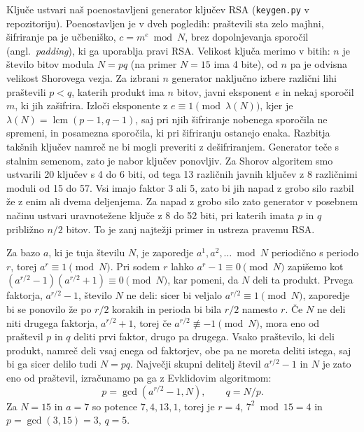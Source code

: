  Ključe ustvari naš poenostavljeni generator ključev RSA (\texttt{keygen.py} v repozitoriju). Poenostavljen je v dveh pogledih: praštevili sta zelo majhni, šifriranje pa je učbeniško, $c = m^e \bmod N$, brez dopolnjevanja sporočil (angl.\ \emph{padding}), ki ga uporablja pravi RSA. Velikost ključa merimo v bitih: $n$ je število bitov modula $N = pq$ (na primer $N = 15$ ima 4 bite), od $n$ pa je odvisna velikost Shorovega vezja. Za izbrani $n$ generator naključno izbere različni lihi praštevili $p < q$, katerih produkt ima $n$ bitov, javni eksponent $e$ in nekaj sporočil $m$, ki jih zašifrira. Izloči eksponente z $e \equiv 1 \pmod{\lambda(N)}$, kjer je $\lambda(N) = \operatorname{lcm}(p-1, q-1)$, saj pri njih šifriranje nobenega sporočila ne spremeni, in posamezna sporočila, ki pri šifriranju ostanejo enaka. Razbitja takšnih ključev namreč ne bi mogli preveriti z dešifriranjem. Generator teče s stalnim semenom, zato je nabor ključev ponovljiv. Za Shorov algoritem smo ustvarili 20 ključev s 4 do 6 biti, od tega 13 različnih javnih ključev z 8 različnimi moduli od 15 do 57. Vsi imajo faktor 3 ali 5, zato bi jih napad z grobo silo razbil že z enim ali dvema deljenjema. Za napad z grobo silo zato generator v posebnem načinu ustvari uravnotežene ključe z 8 do 52 biti, pri katerih imata $p$ in $q$ približno $n/2$ bitov. To je zanj najtežji primer in ustreza pravemu RSA.

 Za bazo $a$, ki je tuja številu $N$, je zaporedje $a^1, a^2, \dots \bmod N$ periodično s periodo $r$, torej $a^r \equiv 1 \pmod N$. Pri sodem $r$ lahko $a^r - 1 \equiv 0 \pmod N$ zapišemo kot $(a^{r/2}-1)(a^{r/2}+1) \equiv 0 \pmod N$, kar pomeni, da $N$ deli ta produkt. Prvega faktorja, $a^{r/2}-1$, število $N$ ne deli: sicer bi veljalo $a^{r/2} \equiv 1 \pmod N$, zaporedje bi se ponovilo že po $r/2$ korakih in perioda bi bila $r/2$ namesto $r$. Če $N$ ne deli niti drugega faktorja, $a^{r/2}+1$, torej če $a^{r/2} \not\equiv -1 \pmod N$, mora eno od praštevil $p$ in $q$ deliti prvi faktor, drugo pa drugega. Vsako praštevilo, ki deli produkt, namreč deli vsaj enega od faktorjev, obe pa ne moreta deliti istega, saj bi ga sicer delilo tudi $N = pq$. Največji skupni delitelj števil $a^{r/2}-1$ in $N$ je zato eno od praštevil, izračunamo pa ga z Evklidovim algoritmom:
\begin{equation}
p = \gcd\!\left(a^{r/2} - 1, N\right), \qquad q = N / p.
\label{g29:eq:faktorja}
\end{equation}
Za $N = 15$ in $a = 7$ so potence $7, 4, 13, 1$, torej je $r = 4$, $7^2 \bmod 15 = 4$ in $p = \gcd(3, 15) = 3$, $q = 5$.

